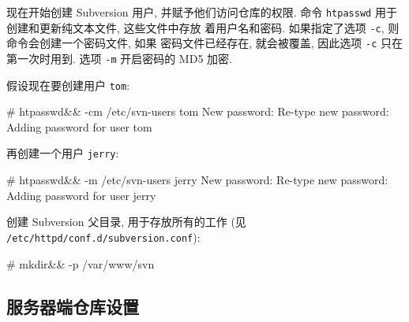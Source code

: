 \documentclass[nofonts, oneside]{ctexart}
\newcommand\shellcmd[1]{\texttt{#1}}
\begin{document}
现在开始创建 Subversion 用户, 并赋予他们访问仓库的权限. 命令
\shellcmd{htpasswd} 用于创建和更新纯文本文件,
这些文件中存放
着用户名和密码. 如果指定了选项 \shellcmd{-c}, 则命令会创建一个密码文件, 如果
密码文件已经存在, 就会被覆盖, 因此选项 \shellcmd{-c} 只在第一次时用到. 选项
\shellcmd{-m} 开启密码的 MD5 加密.

假设现在要创建用户 \texttt{tom}:
\begin{svnshell}
# htpasswd&& -cm /etc/svn-users tom
New password:
Re-type new password:
Adding password for user tom
\end{svnshell}

再创建一个用户 \texttt{jerry}:
\begin{svnshell}
# htpasswd&& -m /etc/svn-users jerry
New password:
Re-type new password:
Adding password for user jerry
\end{svnshell}

创建 Subversion 父目录, 用于存放所有的工作  (见
\texttt{/etc/httpd/conf.d/subversion.conf}):
\begin{svnshell}
# mkdir&& -p /var/www/svn
\end{svnshell}

\subsection{服务器端仓库设置}
\label{subsec:repository_setup}
\end{document}
